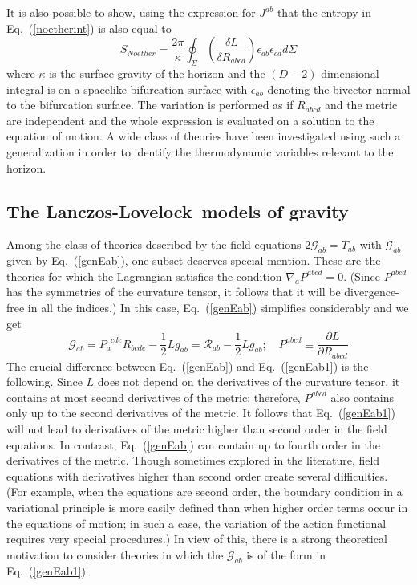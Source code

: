 \documentclass[12pt]{iopart}
\def\eq#1{{Eq.~(\ref{#1})}}
\newcommand{\LL}{Lanczos-Lovelock}
\begin{document}
 It is also possible to show, using the expression for $J^{ab}$ that the entropy in \eq{noetherint} is also equal to 
\begin{equation}
S_{Noether} = \frac{2\pi}{\kappa} \oint_\Sigma \left( \frac{\delta L}{\delta R_{abcd}}\right)\epsilon_{ab}\epsilon_{cd} d\Sigma
\label{SNoether}
\end{equation} 
where $\kappa $ is the surface gravity of the horizon and the $(D-2)$-dimensional
integral is on a spacelike bifurcation surface with $\epsilon_{ab}$ denoting
the  bivector normal to the bifurcation surface. The variation is performed
as if $R_{abcd}$ and the metric are independent and the whole expression is
evaluated on a solution to the equation of motion.
A wide class of theories have been investigated using such a generalization in order to identify the thermodynamic variables relevant to the horizon.

\subsection{The \LL\ models of gravity}\label{sec:llgravity}

Among the class of theories described by the field equations $2\mathcal{G}_{ab} = T_{ab}$ with $\mathcal{G}_{ab}$ given by \eq{genEab},
one subset deserves special mention. These are the theories for which the Lagrangian 
satisfies the condition $\nabla_a P^{abcd} =0$.
(Since $P^{abcd}$ has the symmetries of the curvature tensor, it follows that it will be divergence-free in all the indices.) In this case, \eq{genEab} simplifies considerably and we get 
\begin{equation}
\mathcal{G}_{ab}=P_a^{\phantom{a} cde} R_{bcde}  - \frac{1}{2} L g_{ab}
=\mathcal{R}_{ab}-\frac{1}{2} L g_{ab};\quad
P^{abcd} \equiv \frac{\partial L}{\partial R_{abcd}}
\label{genEab1}
\end{equation}
The crucial difference between \eq{genEab} and  \eq{genEab1} 
is the following. Since $L$ does not depend on the derivatives of the curvature tensor,
it contains at most second derivatives of the metric;  therefore, $P^{abcd}$ also contains only up to the second derivatives of the metric. It follows that
\eq{genEab1} will not lead to derivatives of the metric higher than second order  in the field equations. In contrast, \eq{genEab} can contain up to fourth order in the derivatives of the metric. 
 Though sometimes explored in the literature, field equations with derivatives higher than second order create several difficulties. (For example, when the equations are second order, the boundary condition in a variational principle is more easily defined than when higher order terms occur in the equations of motion;  in such a case, the 
 variation of the action functional requires very special procedures.)  In view of this, there is a strong theoretical motivation to consider theories in which the $\mathcal{G}_{ab}$ is of the form in \eq{genEab1}. 
 
\end{document}
